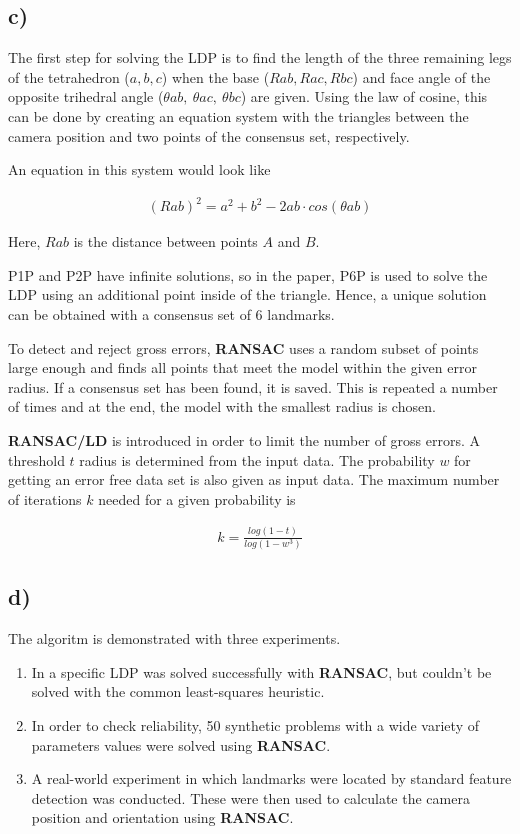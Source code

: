 \documentclass{article}
\begin{document}
  \subsection*{c)}

  The first step for solving the LDP is to find the length of the three remaining legs of the tetrahedron ($\mathit{a, b, c}$) when the base ($\mathit{Rab, Rac, Rbc}$) and face angle of the opposite trihedral angle ($\theta{}ab,\ \theta{}ac,\ \theta{}bc$) are given. Using the law of cosine, this can be done by creating an equation system with the triangles between the camera position and two points of the consensus set, respectively.

  An equation in this system would look like

  \begin{align*}
    (Rab)^2 = a^2 + b^2 - 2 a b \cdot cos(\theta a b)
  \end{align*}

  Here, $Rab$ is the distance between points $A$ and $B$.

  P1P and P2P have infinite solutions, so in the paper, P6P is used to solve the LDP using an additional point inside of the triangle. Hence, a unique solution can be obtained with a consensus set of 6 landmarks.

  To detect and reject gross errors, \textbf{RANSAC} uses a random subset of points large enough and finds all points that meet the model within the given error radius. If a consensus set has been found, it is saved. This is repeated a number of times and at the end, the model with the smallest radius is chosen.

  \textbf{RANSAC/LD} is introduced in order to limit the number of gross errors. A threshold $t$ radius is determined from the input data. The probability $w$ for getting an error free data set is also given as input data. The maximum number of iterations $k$ needed for a given probability is

  \begin{align*}
    k = \frac{log(1 - t)}{log(1 - w^3)}
  \end{align*}

  \subsection*{d)}

  The algoritm is demonstrated with three experiments.

  \begin{enumerate}
    \item In a specific LDP was solved successfully with \textbf{RANSAC}, but couldn't be solved with the common least-squares heuristic.
    \item In order to check reliability, 50 synthetic problems with a wide variety of parameters values were solved using \textbf{RANSAC}.
    \item A real-world experiment in which landmarks were located by standard feature detection was conducted. These were then used to calculate the camera position and orientation using \textbf{RANSAC}.
  \end{enumerate}
\end{document}
